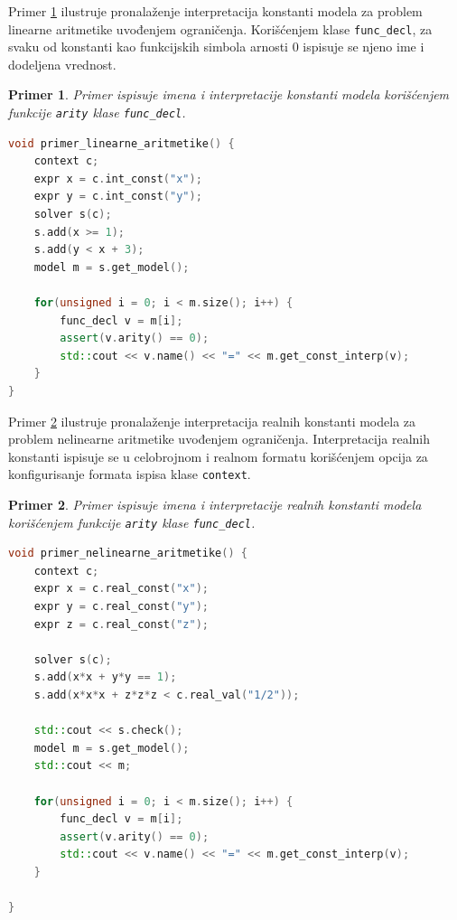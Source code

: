 \documentclass[12pt,oneside]{memoir}
\newtheorem{primer}{Primer}
\begin{document}
Primer \ref{ex4} ilustruje pronalaženje interpretacija konstanti modela za problem linearne aritmetike uvođenjem ograničenja. Korišćenjem klase \texttt{func\_decl}, za svaku od konstanti kao funkcijskih simbola arnosti 0 ispisuje se njeno ime i dodeljena vrednost. 
\begin{primer} \label{ex4}
Primer ispisuje imena i interpretacije konstanti modela korišćenjem funkcije \texttt{arity} klase \texttt{func\_decl}.
\\
\begin{lstlisting}[language=C++]
void primer_linearne_aritmetike() {
    context c;
    expr x = c.int_const("x");
    expr y = c.int_const("y");
    solver s(c);
    s.add(x >= 1);
    s.add(y < x + 3);
    model m = s.get_model();

    for(unsigned i = 0; i < m.size(); i++) {
        func_decl v = m[i];
        assert(v.arity() == 0); 
        std::cout << v.name() << "=" << m.get_const_interp(v);
    }
}
\end{lstlisting}
\end{primer}

Primer \ref{ex5} ilustruje pronalaženje interpretacija realnih konstanti modela za problem nelinearne aritmetike uvođenjem ograničenja. Interpretacija realnih konstanti ispisuje se u celobrojnom i realnom formatu korišćenjem opcija za konfigurisanje formata ispisa klase \texttt{context}. 

\begin{primer} \label{ex5}
Primer ispisuje imena i interpretacije realnih konstanti modela korišćenjem funkcije \texttt{arity} klase \texttt{func\_decl}.
\\
\begin{lstlisting}[language=C++]
void primer_nelinearne_aritmetike() {    
    context c;
    expr x = c.real_const("x");
    expr y = c.real_const("y");
    expr z = c.real_const("z");
                     
    solver s(c);
    s.add(x*x + y*y == 1);                    
    s.add(x*x*x + z*z*z < c.real_val("1/2"));  
    
    std::cout << s.check();
    model m = s.get_model();
    std::cout << m;
    
    for(unsigned i = 0; i < m.size(); i++) {
        func_decl v = m[i];
        assert(v.arity() == 0); 
        std::cout << v.name() << "=" << m.get_const_interp(v);
    }

}
\end{lstlisting}
\end{primer}
\end{document}
